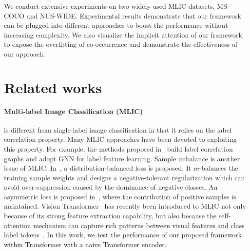 \documentclass{article}
\begin{document}
We conduct extensive experiments on two widely-used MLIC datasets, MS-COCO and NUS-WIDE.
Experimental results demonstrate that our framework can be plugged into different approaches to boost the performance without increasing complexity.
We also visualize the implicit attention of our framework to expose the overfitting of co-occurrence and demonstrate the effectiveness of our approach.

\vspace{-0.25cm}
\section{Related works}
\vspace{-0.05cm}
\paragraph{Multi-label Image Classification (MLIC)} is different from single-label image classification in that it relies on the label correlation property.
Many MLIC approaches have been devoted to exploiting this property.
For example, the methods proposed in~\cite{chen2019learning,chen2019multi} build label correlation graphs and adopt GNN for label feature learning.
Sample imbalance is another issue of MLIC.
In~\cite{wu2020distribution}, a distribution-balanced loss is proposed.
It re-balances the training sample weights and designs a negative-tolerant regularization which can avoid over-suppression caused by the dominance of negative classes.
An asymmetric loss is proposed in~\cite{ridnik2021asymmetric}, where the contribution of positive samples is maintained.
Vision Transformer~\cite{dosovitskiy2020image} has recently been introduced to MLIC not only because of its strong feature extraction capability, but also because the self-attention mechanism can capture rich patterns between visual features and class label tokens~\cite{lanchantin2021general,liu2021query2label}.
In this work, we test the performance of our proposed framework within Transformer with a naive Transformer encoder.
\end{document}
